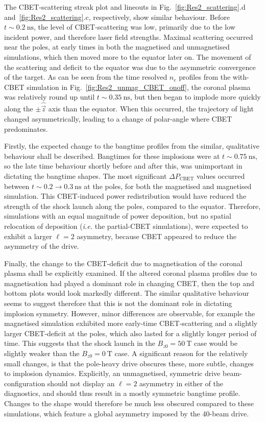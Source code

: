 The \ac{CBET}-scattering streak plot and lineouts in Fig.~\ref{fig:Res2_scattering}.d and~\ref{fig:Res2_scattering}.c, respectively, show similar behaviour.
Before $t\sim0.2\ \text{ns}$, the level of \ac{CBET}-scattering was low, primarily due to the low incident power, and therefore laser field strengths.
Maximal scattering occurred near the poles, at early times in both the magnetised and unmagnetised simulations, which then moved more to the equator later on.
The movement of the scattering and deficit to the equator was due to the asymmetric convergence of the target.
As can be seen from the time resolved $n_e$ profiles from the with-\ac{CBET} simulation in Fig.~\ref{fig:Res2_unmag_CBET_onoff}, the coronal plasma was relatively round up until $t\sim0.35\ \text{ns}$, but then began to implode more quickly along the $\pm\hat{\vec{z}}$ axis than the equator.
When this occurred, the trajectory of light changed asymmetrically, leading to a change of polar-angle where \ac{CBET} predominates.

Firstly, the expected change to the bangtime profiles from the similar, qualitative behaviour shall be described.
Bangtimes for these implosions were at $t\sim0.75\ \text{ns}$, so the late time behaviour shortly before and after this, was unimportant in dictating the bangtime shapes.
The most significant $\Delta P_{\text{CBET}}$ values occurred between $t\sim0.2\rightarrow0.3\ \text{ns}$ at the poles, for both the magnetised and magnetised simulation.
This \ac{CBET}-induced power redistribution would have reduced the strength of the shock launch along the poles, compared to the equator.
Therefore, simulations with an equal magnitude of power deposition, but no spatial relocation of deposition (\textit{i.e.} the partial-\ac{CBET} simulations), were expected to exhibit a larger $\ell=2$ asymmetry, because \ac{CBET} appeared to reduce the asymmetry of the drive.

Finally, the change to the \ac{CBET}-deficit due to magnetisation of the coronal plasma shall be explicitly examined.
If the altered coronal plasma profiles due to magnetisation had played a dominant role in changing \ac{CBET}, then the top and bottom plots would look markedly different.
The similar qualitative behaviour seems to suggest therefore that this is not the dominant role in dictating implosion symmetry.
However, minor differences are observable, for example the magnetised simulation exhibited more early-time \ac{CBET}-scattering and a slightly larger \ac{CBET}-deficit at the poles, which also lasted for a slightly longer period of time.
This suggests that the shock launch in the $B_{z0}=50\ \text{T}$ case would be slightly weaker than the $B_{z0}=0\ \text{T}$ case.
A significant reason for the relatively small changes, is that the pole-heavy drive obscures these, more subtle, changes to implosion dynamics.
Explicitly, an unmagnetised, symmetric drive beam-configuration should not display an $\ell=2$ asymmetry in either of the diagnostics, and should thus result in a mostly symmetric bangtime profile.
Changes to the shape would therefore be much less obscured compared to these simulations, which feature a global asymmetry imposed by the 40-beam drive.

